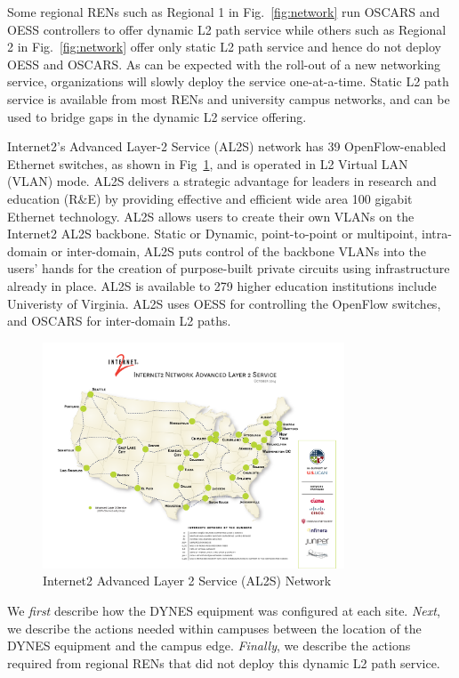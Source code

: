 Some regional RENs such as Regional 1 in Fig.~\ref{fig:network}
run OSCARS and OESS controllers to offer dynamic
L2 path service while others such as Regional 2 in
Fig.~\ref{fig:network} offer only static L2 path service and
hence do not deploy OESS and OSCARS.
As can be expected with the roll-out of a new networking
service, organizations will slowly deploy the service
one-at-a-time. Static L2 path service is available from most RENs
and university campus networks, and can be used to bridge gaps in the
dynamic L2 service offering.

Internet2's Advanced Layer-2 Service (AL2S) network has 39 OpenFlow-enabled
Ethernet switches, as shown in Fig~\ref{fig:AL2S}, and is operated in L2 Virtual LAN (VLAN) mode.
AL2S delivers a strategic advantage for leaders in research and education (R$\&$E) by providing effective and efficient wide area 100 gigabit Ethernet technology. AL2S allows users to create their own VLANs on the Internet2 AL2S backbone. Static or Dynamic, point-to-point or multipoint, intra-domain or inter-domain, AL2S puts control of the backbone VLANs into the users' hands for the creation of purpose-built private circuits using infrastructure already in place. AL2S is available to 279 higher education institutions include Univeristy of Virginia. AL2S uses OESS for controlling the OpenFlow switches, and OSCARS for inter-domain L2 paths.
\begin{figure}[htbp!]
\centering \includegraphics[width=0.80\textwidth]{figures/AL2S.pdf}
\caption{Internet2 Advanced Layer 2 Service (AL2S) Network}
\label{fig:AL2S}
\end{figure}

We \emph{first} describe how the
DYNES equipment was configured at each site.
\emph{Next}, we describe the actions needed within campuses between the
location of the DYNES equipment and the campus edge. \emph{Finally},
we describe the actions required from regional RENs
that did not deploy this dynamic L2 path service.

